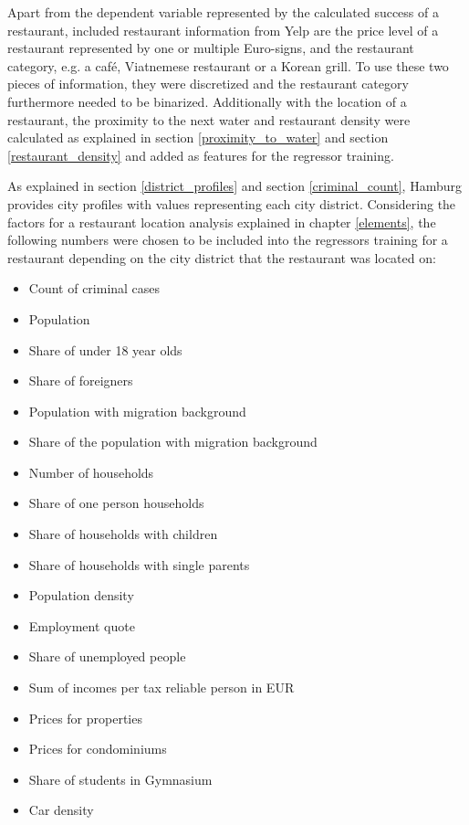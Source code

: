 \documentclass[a4paper, 11pt, oneside]{Thesis}  %
\begin{document}
Apart from the dependent variable represented by the calculated success of a restaurant, included restaurant information from Yelp are the price level of a restaurant represented by one or multiple Euro-signs, and the restaurant category, e.g. a café, Viatnemese restaurant or a Korean grill. To use these two pieces of information, they were discretized and the restaurant category furthermore needed to be binarized. Additionally with the location of a restaurant, the proximity to the next water and restaurant density were calculated as explained in section \ref{proximity_to_water} and section \ref{restaurant_density} and added as features for the regressor training.

As explained in section \ref{district_profiles} and section \ref{criminal_count}, Hamburg provides city profiles with values representing each city district. Considering the factors for a restaurant location analysis explained in chapter \ref{elements}, the following numbers were chosen to be included into the regressors training for a restaurant depending on the city district that the restaurant was located on:
\begin{itemize}
\item Count of criminal cases
\item Population
\item Share of under 18 year olds
\item Share of foreigners
\item Population with migration background
\item Share of the population with migration background
\item Number of households
\item Share of one person households
\item Share of households with children
\item Share of households with single parents
\item Population density
\item Employment quote
\item Share of unemployed people
\item Sum of incomes per tax reliable person in EUR
\item Prices for properties
\item Prices for condominiums
\item Share of students in Gymnasium
\item Car density
\end{itemize}
\end{document}
